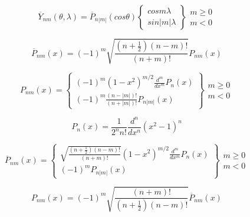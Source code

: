 \documentclass{article}
\begin{document}
\begin{equation}
\overline{Y}_{n m}{\left(\theta,\lambda\right)} = \overline{P}_{n |m|}{\left(cos \theta\right)} \left\{\begin{array}{l}
cos m \lambda \\
sin |m| \lambda
\end{array}\right\} \begin{array}{l}
m \geq 0 \\
m < 0
\end{array}
\end{equation}

\begin{equation}
\overline{P}_{n m}{\left(x\right)} = \left(-1\right)^m \sqrt{\frac{\left(n + \frac{1}{2}\right) \left(n - m\right)!}{\left(n + m\right)!}} P_{n m}{\left(x\right)}
\end{equation}

\begin{equation}
P_{n m}{\left(x\right)} = \left\{\begin{array}{l}
\left(-1\right)^m \left(1 - x^2\right)^{m / 2} \frac{d^m}{d x^m} P_n{\left(x\right)} \\
\left(-1\right)^m \frac{\left(n - |m|\right)!}{\left(n + |m|\right)!} P_{n |m|}{\left(x\right)}
\end{array}\right\} \begin{array}{l}
m \geq 0 \\
m < 0
\end{array}
\end{equation}

\begin{equation}
P_n{\left(x\right)} = \frac{1}{2^n n!} \frac{d^n}{d x^n} \left(x^2 - 1\right)^n
\end{equation}

\begin{equation}
\overline{P}_{n m}{\left(x\right)} = \left\{\begin{array}{l}
\sqrt{\frac{\left(n + \frac{1}{2}\right) \left(n - m\right)!}{\left(n + m\right)!}} \left(1 - x^2\right)^{m / 2} \frac{d^m}{d x^m} P_n{\left(x\right)} \\
\left(-1\right)^m P_{n |m|}{\left(x\right)}
\end{array}\right\} \begin{array}{l}
m \geq 0 \\
m < 0
\end{array}
\end{equation}

\begin{equation}
P_{n m}{\left(x\right)} = \left(-1\right)^m \sqrt{\frac{\left(n + m\right)!}{\left(n + \frac{1}{2}\right) \left(n - m\right)!}} \overline{P}_{n m}{\left(x\right)}
\end{equation}
\end{document}
